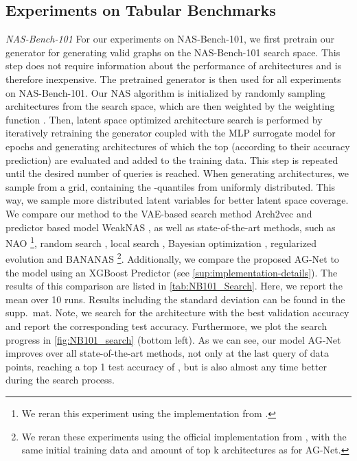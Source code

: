 \documentclass[runningheads]{llncs}
\begin{document}
\subsection{Experiments on Tabular Benchmarks}\label{sec:tabluar_benchmark_experiments}
\noindent \textit{NAS-Bench-101}
For our experiments on NAS-Bench-101, we first pretrain our generator for generating valid graphs on the NAS-Bench-101 search space.
This step does not require information about the performance of architectures and is therefore inexpensive.
The pretrained generator is then used for all experiments on NAS-Bench-101.
Our NAS algorithm is initialized by randomly sampling  architectures from the search space, which are then weighted by the weighting function . Then, latent space optimized architecture search is performed by iteratively retraining the generator coupled with the MLP surrogate model for  epochs and generating  architectures of which the top  (according to their accuracy prediction) are evaluated and added to the training data.
This step is repeated until the desired number of queries is reached.
When generating architectures, we sample from a grid, containing the -quantiles from  uniformly distributed.
This way, we sample more distributed latent variables for better latent space coverage.  We compare our method to the VAE-based search method Arch2vec \cite{2020Arch2vec} and predictor based model WeakNAS \cite{2021WeakNAS}, as well as state-of-the-art methods, such as NAO \cite{2018NAO}\footnote[3]{We reran this experiment using the implementation from \cite{2021HowPP}.},  random search \cite{2019RS}, local search \cite{2020LocalSearchNAS}, Bayesian optimization \cite{2015DNGO}, regularized evolution \cite{2019EvolutionaryNAS} and BANANAS \cite{2021BANANAS}\footnote[2]{We reran these experiments using the official implementation from \cite{2020Study,2021BANANAS,2020LocalSearchNAS}, with the same initial training data and amount of top k architectures as for AG-Net.}.
Additionally, we compare the proposed AG-Net to the model using an XGBoost Predictor (see \autoref{sup:implementation-details}).
The results of this comparison are listed in \autoref{tab:NB101_Search}.
Here, we report the mean over 10 runs. Results including the standard deviation can be found in the supp.~mat.
Note, we search for the architecture with the best validation accuracy and report the corresponding test accuracy.
Furthermore, we plot the search progress in \autoref{fig:NB101_search} (bottom left).
As we can see, our model AG-Net improves over all state-of-the-art methods, not only at the last query of  data points, reaching a top 1 test accuracy of , but is also almost any time better during the search process.
\end{document}
